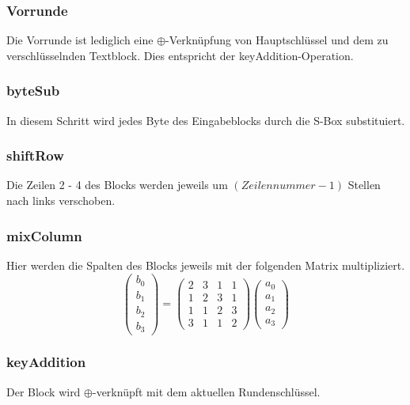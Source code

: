 \documentclass[conference,10pt,a4paper,twocolumn]{IEEEtran}
\begin{document}
\bigskip
\subsubsection{Vorrunde}
Die Vorrunde ist lediglich eine \begin{math}\oplus\end{math}-Verknüpfung von Hauptschlüssel und dem zu verschlüsselnden Textblock. Dies entspricht der keyAddition-Operation.
\bigskip
\subsubsection{byteSub}
In diesem Schritt wird jedes Byte des Eingabeblocks durch die S-Box substituiert.
\bigskip
\subsubsection{shiftRow}
Die Zeilen 2 - 4 des Blocks werden jeweils um \begin{math}(Zeilennummer - 1)\end{math} Stellen nach links verschoben.
\bigskip
\subsubsection{mixColumn}
Hier werden die Spalten des Blocks jeweils mit der folgenden Matrix multipliziert.
\begin{equation}
\begin{pmatrix}
b_0\\
b_1\\
b_2\\
b_3
\end{pmatrix}
=
\begin{pmatrix}
2 & 3 & 1 & 1\\
1 & 2 & 3 & 1\\
1 & 1 & 2 & 3\\
3 & 1 & 1 & 2
\end{pmatrix}
\begin{pmatrix}
a_0\\
a_1\\
a_2\\
a_3
\end{pmatrix}
\end{equation}

\bigskip
\subsubsection{keyAddition}
Der Block wird \begin{math}\oplus\end{math}-verknüpft mit dem aktuellen Rundenschlüssel.
\bigskip
\end{document}
